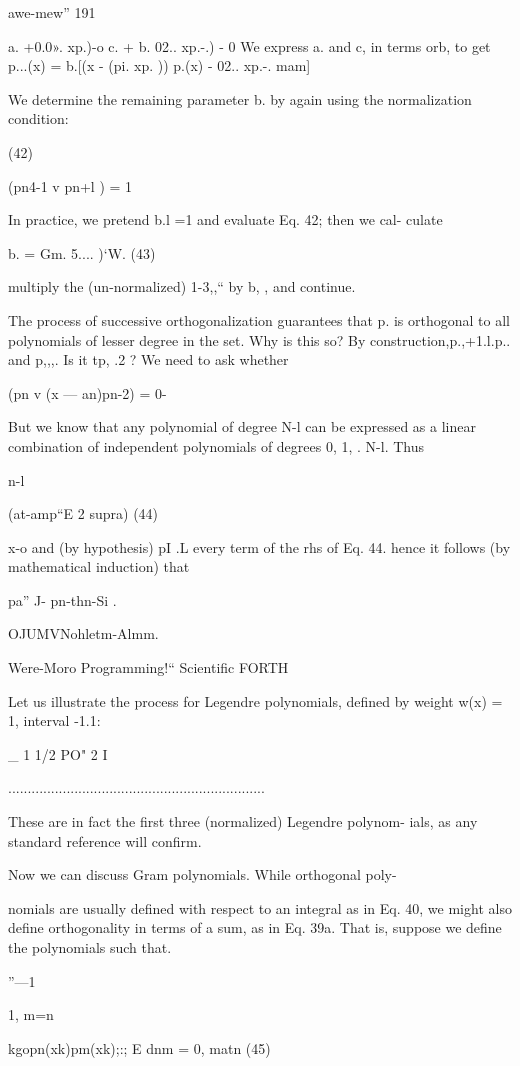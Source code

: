 {{{{{{awe-mew” 191

a. +0.0». xp.)-o
c. + b. 02.. xp.-.) - 0
We express a. and c, in terms orb, to get
p...(x) = b.[(x - (pi. xp. )) p.(x)
- 02.. xp.-. mam]

We determine the remaining parameter b. by again using the
normalization condition:

(42)

(pn4-1 v pn+l ) = 1

In practice, we pretend b.l =1 and evaluate Eq. 42; then we cal-
culate

b. = Gm. 5.... )‘W. (43)

multiply the (un-normalized) 1-3,,“ by b, , and continue.

The process of successive orthogonalization guarantees that p. is
orthogonal to all polynomials of lesser degree in the set. Why is
this so? By construction,p.,+1.l.p.. and p,,,. Is it tp, .2 ? We
need to ask whether

(pn v (x — an)pn-2) = 0-

But we know that any polynomial of degree N-l can be expressed
as a linear combination of independent polynomials of degrees
0, 1, . N-l. Thus

n-l

(at-amp“E 2 supra) (44)

x-o
and (by hypothesis) pI .L every term of the rhs of Eq. 44. hence
it follows (by mathematical induction) that

pa” J- {pn-thn-Si }.

OJUMVNohletm-Almm.

Were-Moro Programming!“ Scientiﬁc FORTH

Let us illustrate the process for Legendre polynomials, deﬁned
by weight w(x) = 1, interval {-1.1}:

_ 1 1/2
PO" 2 I

..................................................................

These are in fact the first three (normalized) Legendre polynom-
ials, as any standard reference will conﬁrm.

Now we can discuss Gram polynomials. While orthogonal poly-

nomials are usually deﬁned with respect to an integral as in
Eq. 40, we might also deﬁne orthogonality in terms of a sum, as
in Eq. 39a. That is, suppose we deﬁne the polynomials such that.

”—1 { 1, m=n

kgopn(xk)pm(xk);:; E dnm = 0, matn (45)

}}}}}}}
